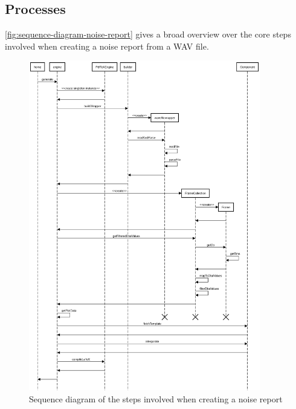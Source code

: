 \clearpage

\subsection{Processes}
\autoref{fig:sequence-diagram-noise-report} gives a broad overview over the core steps involved when creating a noise report from a WAV file.

\begin{figure}[H]
    \centering
    \includegraphics[width=0.9\textwidth]{../assets/sequence_diagram_from_wave_file_to_pdf.png}
    \caption{Sequence diagram of the steps involved when creating a noise report}\label{fig:sequence-diagram-noise-report}
\end{figure}

